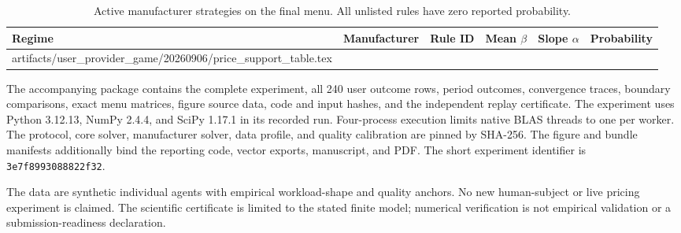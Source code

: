 \documentclass[11pt,a4paper]{article}
\makeatletter
\newcommand{\inputtable}[1]{\@@input #1 }
\makeatother
\begin{document}
\begin{table}[H]
\centering
\caption{Active manufacturer strategies on the final menu. All unlisted rules have zero reported probability.}
\label{tab:support}
\begin{tabular}{@{}llrrrr@{}}
\toprule
Regime & Manufacturer & Rule ID & Mean $\beta$ & Slope $\alpha$ & Probability \\
\midrule
\inputtable{artifacts/user_provider_game/20260906/price_support_table.tex}
\bottomrule
\end{tabular}
\end{table}

The accompanying package contains the complete experiment, all 240 user outcome rows, period outcomes, convergence traces, boundary comparisons, exact menu matrices, figure source data, code and input hashes, and the independent replay certificate. The experiment uses Python 3.12.13, NumPy 2.4.4, and SciPy 1.17.1 in its recorded run. Four-process execution limits native BLAS threads to one per worker. The protocol, core solver, manufacturer solver, data profile, and quality calibration are pinned by SHA-256. The figure and bundle manifests additionally bind the reporting code, vector exports, manuscript, and PDF. The short experiment identifier is \texttt{3e7f8993088822f32}.

The data are synthetic individual agents with empirical workload-shape and quality anchors. No new human-subject or live pricing experiment is claimed. The scientific certificate is limited to the stated finite model; numerical verification is not empirical validation or a submission-readiness declaration.

\clearpage


\end{document}
